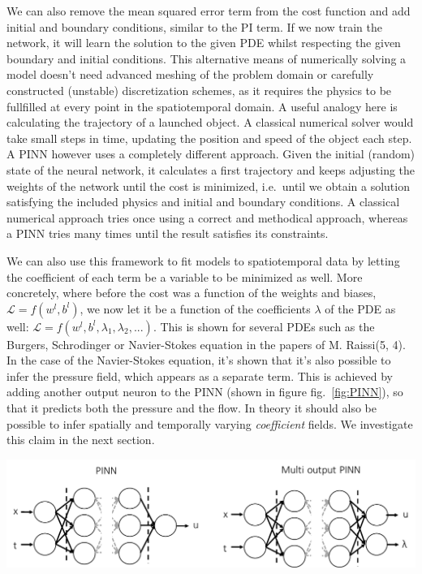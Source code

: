 \documentclass[12pt,a4paper,]{harvard-thesis}
\let\origfigure\figure
\let\endorigfigure\endfigure
\renewenvironment{figure}[1][2] {
    \expandafter\origfigure\expandafter[H]
} {
    \endorigfigure
}
\begin{document}
We can also remove the mean squared error term from the cost function
and add initial and boundary conditions, similar to the PI term. If we
now train the network, it will learn the solution to the given PDE
whilst respecting the given boundary and initial conditions. This
alternative means of numerically solving a model doesn't need advanced
meshing of the problem domain or carefully constructed (unstable)
discretization schemes, as it requires the physics to be fullfilled at
every point in the spatiotemporal domain. A useful analogy here is
calculating the trajectory of a launched object. A classical numerical
solver would take small steps in time, updating the position and speed
of the object each step. A PINN however uses a completely different
approach. Given the initial (random) state of the neural network, it
calculates a first trajectory and keeps adjusting the weights of the
network until the cost is minimized, i.e.~until we obtain a solution
satisfying the included physics and initial and boundary conditions. A
classical numerical approach tries once using a correct and methodical
approach, whereas a PINN tries many times until the result satisfies its
constraints.

We can also use this framework to fit models to spatiotemporal data by
letting the coefficient of each term be a variable to be minimized as
well. More concretely, where before the cost was a function of the
weights and biases, \(\mathcal{L}=f(w^l, b^l)\), we now let it be a
function of the coefficients \(\lambda\) of the PDE as well:
\(\mathcal{L}=f(w^l, b^l, \lambda_1, \lambda_2,...)\). This is shown for
several PDEs such as the Burgers, Schrodinger or Navier-Stokes equation
in the papers of M. Raissi(5, 4). In the case of the Navier-Stokes
equation, it's shown that it's also possible to infer the pressure
field, which appears as a separate term. This is achieved by adding
another output neuron to the PINN (shown in figure fig.~\ref{fig:PINN}),
so that it predicts both the pressure and the flow. In theory it should
also be possible to infer spatially and temporally varying
\emph{coefficient} fields. We investigate this claim in the next
section.

\begin{figure}
\hypertarget{fig:PINN}{%
\centering
\includegraphics{./tex2pdf.-e2e7a14556ab3e0a/2745f3481242b46bab16e1e6e1123da078cc46ab.pdf}
\caption{Left panel: a normal single output PINN. Right panel: a
multi-output PINN. The network now also predicts the coefficients values
at each data point.}\label{fig:PINN}
}
\end{figure}
\end{document}
